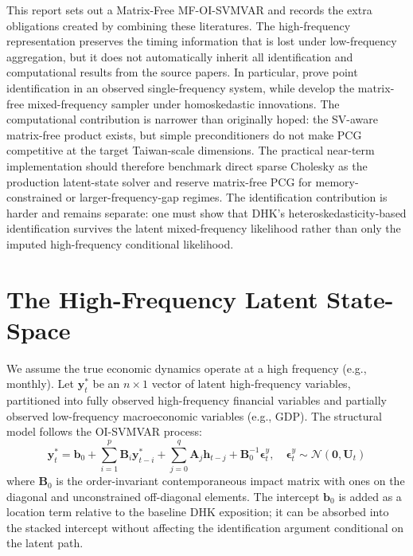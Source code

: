 \documentclass[12pt]{article}
\begin{document}
This report sets out a Matrix-Free MF-OI-SVMVAR and records the extra obligations created by combining these literatures. The high-frequency representation preserves the timing information that is lost under low-frequency aggregation, but it does not automatically inherit all identification and computational results from the source papers. In particular, \citet{davidson2025investigating} prove point identification in an observed single-frequency system, while \citet{zhu2026structural} develop the matrix-free mixed-frequency sampler under homoskedastic innovations. The computational contribution is narrower than originally hoped: the SV-aware matrix-free product exists, but simple preconditioners do not make PCG competitive at the target Taiwan-scale dimensions. The practical near-term implementation should therefore benchmark direct sparse Cholesky as the production latent-state solver and reserve matrix-free PCG for memory-constrained or larger-frequency-gap regimes. The identification contribution is harder and remains separate: one must show that DHK's heteroskedasticity-based identification survives the latent mixed-frequency likelihood rather than only the imputed high-frequency conditional likelihood.

\section{The High-Frequency Latent State-Space}
We assume the true economic dynamics operate at a high frequency (e.g., monthly). Let $\mathbf{y}_t^*$ be an $n \times 1$ vector of latent high-frequency variables, partitioned into fully observed high-frequency financial variables and partially observed low-frequency macroeconomic variables (e.g., GDP). The structural model follows the OI-SVMVAR process:
\begin{equation}
    \mathbf{y}_t^* = \mathbf{b}_0 + \sum_{i=1}^p \mathbf{B}_i \mathbf{y}_{t-i}^* + \sum_{j=0}^q \mathbf{A}_j \mathbf{h}_{t-j} + \mathbf{B}_0^{-1} \bm{\epsilon}^y_t, \quad \bm{\epsilon}^y_t \sim \mathcal{N}(\mathbf{0}, \mathbf{U}_t)
\end{equation}
where $\mathbf{B}_0$ is the order-invariant contemporaneous impact matrix with ones on the diagonal and unconstrained off-diagonal elements. The intercept $\mathbf{b}_0$ is added as a location term relative to the baseline DHK exposition; it can be absorbed into the stacked intercept without affecting the identification argument conditional on the latent path.
\end{document}

